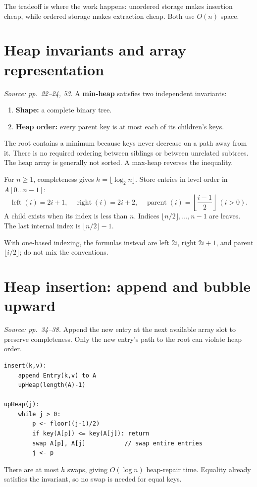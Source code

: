 \documentclass[11pt]{article}
\begin{document}
The tradeoff is where the work happens: unordered storage makes insertion cheap, while ordered storage makes extraction cheap. Both use $O(n)$ space.

\section{Heap invariants and array representation}
\textit{Source: pp.\ 22--24, 53.}
A \textbf{min-heap} satisfies two independent invariants:
\begin{enumerate}
\item \textbf{Shape:} a complete binary tree.
\item \textbf{Heap order:} every parent key is at most each of its children's keys.
\end{enumerate}
The root contains a minimum because keys never decrease on a path away from it. There is no required ordering between siblings or between unrelated subtrees. The heap array is generally not sorted. A max-heap reverses the inequality.

For $n\ge1$, completeness gives $h=\lfloor\log_2 n\rfloor$. Store entries in level order in $A[0\ldots n-1]$:
\[
\operatorname{left}(i)=2i+1,\quad
\operatorname{right}(i)=2i+2,\quad
\operatorname{parent}(i)=\left\lfloor\frac{i-1}{2}\right\rfloor\ (i>0).
\]
A child exists when its index is less than $n$. Indices $\lfloor n/2\rfloor,\ldots,n-1$ are leaves. The last internal index is $\lfloor n/2\rfloor-1$.

With one-based indexing, the formulas instead are left $2i$, right $2i+1$, and parent $\lfloor i/2\rfloor$; do not mix the conventions.

\section{Heap insertion: append and bubble upward}
\textit{Source: pp.\ 34--38.}
Append the new entry at the next available array slot to preserve completeness. Only the new entry's path to the root can violate heap order.
\begin{lstlisting}
insert(k,v):
    append Entry(k,v) to A
    upHeap(length(A)-1)

upHeap(j):
    while j > 0:
        p <- floor((j-1)/2)
        if key(A[p]) <= key(A[j]): return
        swap A[p], A[j]           // swap entire entries
        j <- p
\end{lstlisting}
There are at most $h$ swaps, giving $O(\log n)$ heap-repair time. Equality already satisfies the invariant, so no swap is needed for equal keys.
\end{document}
